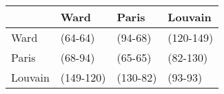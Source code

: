 \begin{tabular}{llll}
\toprule
{} &       Ward &     Paris &    Louvain \\
\midrule
Ward    &    (64-64) &   (94-68) &  (120-149) \\
Paris   &    (68-94) &   (65-65) &   (82-130) \\
Louvain &  (149-120) &  (130-82) &    (93-93) \\
\bottomrule
\end{tabular}
